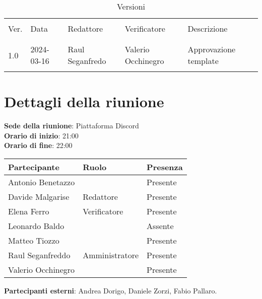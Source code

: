 \documentclass[italian,12pt]{article}
\begin{document}


\newpage



\begin{table}[!h]
	\caption{Versioni}
	\footnotesize
	\begin{center}
		\begin{tabular}{ l l l l p{6cm} }
			\hline                                                                              \\[-2ex]
			Ver. & Data       & Redattore          & Verificatore       & Descrizione           \\
			\\[-2ex] \hline \\[-1.5ex]
			1.0  & 2024-03-16 & Raul Seganfredo    & Valerio Occhinegro & Approvazione template \\
			\\[-1.5ex] \hline
		\end{tabular}
	\end{center}
\end{table}

\newpage

\tableofcontents

\newpage

\section{Dettagli della riunione}


\textbf{Sede della riunione}: Piattaforma Discord\\
\textbf{Orario di inizio}: 21:00\\
\textbf{Orario di fine}: 22:00\\

\begin{flushleft}
	\begin{table}[!h]
	\begin{tabular}{ |l|l|l| } 
		\hline
		\textbf{Partecipante} & \textbf{Ruolo}       & \textbf{Presenza} \\
		\hline 
		Antonio Benetazzo     &                      & Presente          \\
		Davide Malgarise      & Redattore            & Presente          \\
		Elena Ferro           & Verificatore         & Presente          \\
		Leonardo Baldo        &                      & Assente           \\
		Matteo Tiozzo         &                      & Presente          \\
		Raul Seganfreddo      & Amministratore       & Presente          \\
		Valerio Occhinegro    &                      & Presente          \\
		\hline
	\end{tabular}
	\end{table}
	\textbf{Partecipanti esterni}: Andrea Dorigo, Daniele Zorzi, Fabio Pallaro.\\
\end{flushleft}
\end{document}
